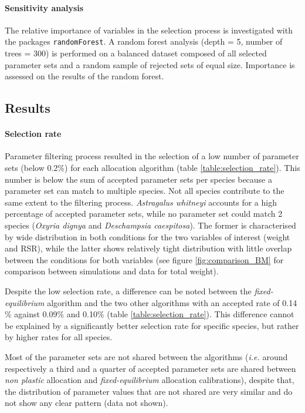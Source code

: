 \paragraph{Sensitivity analysis}
The relative importance of variables in the selection process is investigated with the packages \texttt{randomForest}. A random forest analysis (depth = 5, number of trees = 300) is performed on a balanced dataset composed of all selected parameter sets and a random sample of rejected sets of equal size. Importance is assessed on the results of the random forest.

\subsection{Results}

\paragraph{Selection rate}
Parameter filtering process resulted in the selection of a low number of parameter sets (below 0.2\%) for each allocation algorithm (table \ref{table:selection_rate}). This number is below the sum of accepted parameter sets per species because a parameter set can match to multiple species. Not all species contribute to the same extent to the filtering process. \textit{Astragalus whitneyi} accounts for a high percentage of accepted parameter sets, while no parameter set could match 2 species (\textit{Oxyria dignya} and \textit{Deschampsia caespitosa}). The former is characterised by wide distribution in both conditions for the two variables of interest (weight and RSR), while the latter shows relatively tight distribution with little overlap between the conditions for both variables (see figure \ref{fig:comparison_BM} for comparison between simulations and data for total weight).


\vspace*{12pt}
Despite the low selection rate, a difference can be noted between the \textit{fixed-equilibrium} algorithm and the two other algorithms with an accepted rate of 0.14 \% against 0.09\% and 0.10\% (table \ref{table:selection_rate}). This difference cannot be explained by a significantly better selection rate for specific species, but rather by higher rates for all species.

Most of the parameter sets are not shared between the algorithms (\textit{i.e.} around respectively a third and a quarter of accepted parameter sets are shared between \textit{non plastic} allocation and \textit{fixed-equilibrium} allocation calibrations), despite that, the distribution of parameter values that are not shared are very similar and do not show any clear pattern (data not shown).

